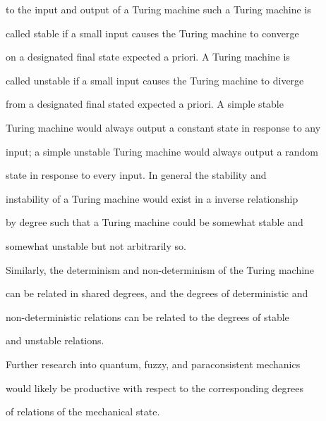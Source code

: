 to the input and output of a Turing machine such a Turing machine is

called stable if a small input causes the Turing machine to converge

on a designated final state expected a priori. A Turing machine is

called unstable if a small input causes the Turing machine to diverge

from a designated final stated expected a priori. A simple stable

Turing machine would always output a constant state in response to any

input; a simple unstable Turing machine would always output a random

state in response to every input. In general the stability and

instability of a Turing machine would exist in a inverse relationship

by degree such that a Turing machine could be somewhat stable and

somewhat unstable but not arbitrarily so.

Similarly, the determinism and non-determinism of the Turing machine

can be related in shared degrees, and the degrees of deterministic and

non-deterministic relations can be related to the degrees of stable

and unstable relations.

Further research into quantum, fuzzy, and paraconsistent mechanics

would likely be productive with respect to the corresponding degrees

of relations of the mechanical state.


